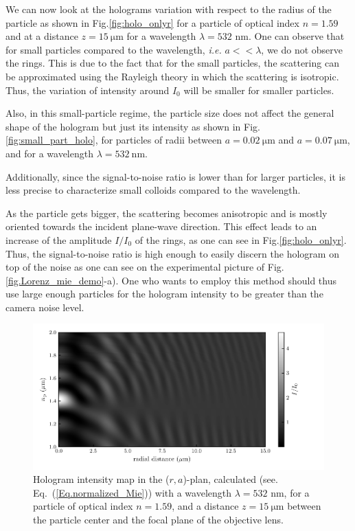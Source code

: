 We can now look at the holograms variation with respect to the radius of the particle as shown in Fig.\ref{fig:holo_onlyr} for a particle of optical index $n = 1.59$ and at a distance $z = 15 ~\mathrm{\mu m }$ for a wavelength $\lambda = 532$ nm. One can observe that for small particles compared to the wavelength, \textit{i.e.} $a << \lambda$, we do not observe the rings. This is due to the fact that for the small particles, the scattering can be approximated using the Rayleigh theory in which the scattering is isotropic. Thus, the variation of intensity around $I_0$ will be smaller for smaller particles.

Also, in this small-particle regime, the particle size does not affect the general shape of the hologram but just its intensity as shown in Fig.\ref{fig:small_part_holo}, for particles of radii between $a = 0.02 ~\mathrm{\mu m}$ and $a = 0.07 ~\mathrm{\mu m}$, and for a wavelength $\lambda = 532 ~\mathrm{nm}$.

Additionally, since the signal-to-noise ratio is lower than for larger particles, it is less precise to characterize small colloids compared to the wavelength.


As the particle gets bigger, the scattering becomes anisotropic and is mostly oriented towards the incident plane-wave direction. This effect leads to an increase of the amplitude $I/I_0$ of the rings, as one can see in Fig.\ref{fig:holo_onlyr}. Thus, the signal-to-noise ratio is high enough to easily discern the hologram on top of the noise as one can see on the experimental picture of Fig.\ref{fig.Lorenz_mie_demo}-a). One who wants to employ this method should thus use large enough particles for the hologram intensity to be greater than the camera noise level.



\begin{figure}[H]
	\centering
	\includegraphics{02_body/chapter2/images/holo_size_exemple/holos_only_n.pdf}
	\caption{Hologram intensity map in the ($r,a$)-plan, calculated (see. Eq.~(\ref{Eq.normalized_Mie})) with a wavelength $\lambda = 532$ nm, for a particle of optical index $n = 1.59$, and a distance $z = 15 ~\mathrm{\mu m}$ between the particle center and the focal plane of the objective lens.~\href{https://github.com/eXpensia/Confined-Brownian-Motion/blob/main/02_body/chapter2/images/holo_size_exemple/holosize_variation.ipynb}{\faGithub}}
	\label{fig:holo_onlyn}
\end{figure}


